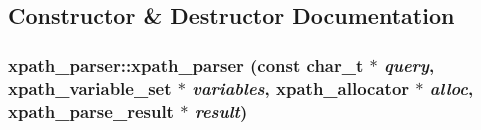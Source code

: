 \subsection{Constructor \& Destructor Documentation}
\hypertarget{structxpath__parser_a3f5b4a04f4d0a0a44962d9825a86ed0d}{
\subsubsection[{xpath\_\-parser}]{\setlength{\rightskip}{0pt plus 5cm}xpath\_\-parser::xpath\_\-parser (const char\_\-t $\ast$ {\em query}, \/  xpath\_\-variable\_\-set $\ast$ {\em variables}, \/  {\bf xpath\_\-allocator} $\ast$ {\em alloc}, \/  xpath\_\-parse\_\-result $\ast$ {\em result})}}
\label{structxpath__parser_a3f5b4a04f4d0a0a44962d9825a86ed0d}


